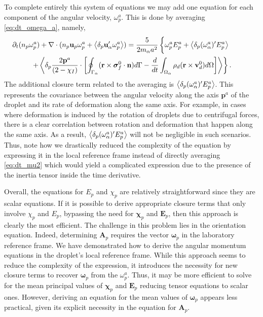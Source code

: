 To complete entirely this system of equations we may add one equation for each component of the angular velocity, $\omega_p^a$. 
This is done by averaging \ref{eq:dt_omega_a}, namely,
\begin{multline}
    \pddt (n_p \omega^a_p)
    + \div (
        n_p \textbf{u}_p \omega^a_p 
        + \pavg{\textbf{u}_\alpha' \omega^a_p}
    )
    = 
    \frac{5}{2 m_\alpha a^2}\left\{
        \omega^a_p E^a_p + \pavg{(\omega^a_\alpha)' E^a_p} \phantom{\intS{}} \right. \\ \left.
        +\pavg{
        \frac{2 \textbf{p}^a}{ (2 - \chi_I)}\cdot 
        \left[\intS{(\textbf{r}\times\bm\sigma_f^0\cdot \textbf{n})} 
        - \ddt\intO{\rho_d(\textbf{r}\times \textbf{v}_d^0)}\right]
        }
    \right\}. 
\end{multline}
The additional closure term related to the averaging is $\left<\delta_p (\omega^a_\alpha)' E^a_p\right>$.
This represents the covariance between the angular velocity along the axis $\textbf{p}^a$ of the droplet and its rate of deformation along the same axis. 
For example, in cases where deformation is induced by the rotation of droplets due to centrifugal forces, there is a clear correlation between rotation and deformation that happen along the same axis. 
As a result, $\left<\delta_p (\omega^a_\alpha)' E^a_p\right>$ will not be negligible in such scenarios.
Thus, note how we drastically reduced the complexity of the equation by expressing it in the local reference frame instead of directly averaging \ref{eq:dt_mu2} which would yield a complicated expression due to the presence of the inertia tensor inside the time derivative.  

Overall, the equations for $E_p$ and $\chi_p$ are relatively straightforward since they are scalar equations. 
If it is possible to derive appropriate closure terms that only involve $\chi_p$ and $E_p$, bypassing the need for $\bm\chi_p$ and $\textbf{E}_p$, then this approach is clearly the most efficient. 
The challenge in this problem lies in the orientation equation.
Indeed, determining $\textbf{A}_p$ requires the vector $\bm\omega_p$ in the laboratory reference frame.
We have demonstrated how to derive the angular momentum equations in the droplet's local reference frame. 
While this approach seems to reduce the complexity of the expression, it introduces the necessity for new closure terms to recover $\bm\omega_p$ from the $\omega^a_p$. 
Thus, it may be more efficient to solve for the mean principal values of $\bm\chi_p$ and $\textbf{E}_p$ reducing tensor equations to scalar ones.
However, deriving an equation for the mean values of $\bm\omega_p$ appears less practical, given its explicit necessity in the equation for $\textbf{A}_p$. 

